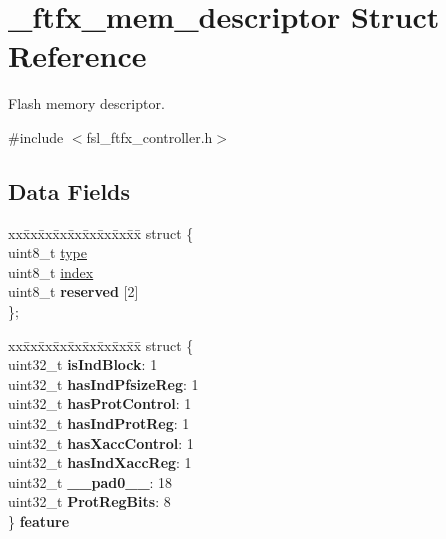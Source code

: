 \hypertarget{struct__ftfx__mem__descriptor}{}\section{\+\_\+ftfx\+\_\+mem\+\_\+descriptor Struct Reference}
\label{struct__ftfx__mem__descriptor}


Flash memory descriptor.  




{\ttfamily \#include $<$fsl\+\_\+ftfx\+\_\+controller.\+h$>$}

\subsection*{Data Fields}
\begin{DoxyCompactItemize}
\item 
\begin{tabbing}
xx\=xx\=xx\=xx\=xx\=xx\=xx\=xx\=xx\=\kill
struct \{\\
\>uint8\_t \mbox{\hyperlink{group__ftfx__controller_ga1d127017fb298b889f4ba24752d08b8e}{type}}\\
\>uint8\_t \mbox{\hyperlink{group__ftfx__controller_gaae5a12e607d0f782506d9e6ec6179c64}{index}}\\
\>uint8\_t {\bfseries reserved} \mbox{[}2\mbox{]}\\
\}; \\

\end{tabbing}\item 
\begin{tabbing}
xx\=xx\=xx\=xx\=xx\=xx\=xx\=xx\=xx\=\kill
struct \{\\
\>uint32\_t {\bfseries isIndBlock}: 1\\
\>uint32\_t {\bfseries hasIndPfsizeReg}: 1\\
\>uint32\_t {\bfseries hasProtControl}: 1\\
\>uint32\_t {\bfseries hasIndProtReg}: 1\\
\>uint32\_t {\bfseries hasXaccControl}: 1\\
\>uint32\_t {\bfseries hasIndXaccReg}: 1\\
\>uint32\_t {\bfseries \_\_pad0\_\_}: 18\\
\>uint32\_t {\bfseries ProtRegBits}: 8\\
\} {\bfseries feature}\\


\end{tabbing}
\end{DoxyCompactItemize}
